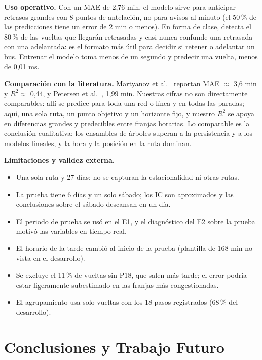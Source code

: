 \documentclass[conference,spanish]{IEEEtran}
\begin{document}
\textbf{Uso operativo.} Con un MAE de 2,76 min, el modelo sirve para anticipar retrasos grandes con 8 puntos de antelación, no para avisos al minuto (el 50\,\% de las predicciones tiene un error de 2 min o menos). En forma de clase, detecta el 80\,\% de las vueltas que llegarán retrasadas y casi nunca confunde una retrasada con una adelantada: es el formato más útil para decidir si retener o adelantar un bus. Entrenar el modelo toma menos de un segundo y predecir una vuelta, menos de 0,01 ms.

\textbf{Comparación con la literatura.} Martyanov et al.~\cite{martyanov2026} reportan MAE $\approx$ 3,6 min y $R^2\approx$ 0,44, y Petersen et al.~\cite{petersen2019}, 1,99 min. Nuestras cifras no son directamente comparables: allí se predice para toda una red o línea y en todas las paradas; aquí, una sola ruta, un punto objetivo y un horizonte fijo, y nuestro $R^2$ se apoya en diferencias grandes y predecibles entre franjas horarias. Lo comparable es la conclusión cualitativa: los ensambles de árboles superan a la persistencia y a los modelos lineales, y la hora y la posición en la ruta dominan.

\textbf{Limitaciones y validez externa.}
\begin{itemize}
    \item Una sola ruta y 27 días: no se capturan la estacionalidad ni otras rutas.
    \item La prueba tiene 6 días y un solo sábado; los IC son aproximados y las conclusiones sobre el sábado descansan en un día.
    \item El periodo de prueba se usó en el E1, y el diagnóstico del E2 sobre la prueba motivó las variables en tiempo real.
    \item El horario de la tarde cambió al inicio de la prueba (plantilla de 168 min no vista en el desarrollo).
    \item Se excluye el 11\,\% de vueltas sin P18, que salen más tarde; el error podría estar ligeramente subestimado en las franjas más congestionadas.
    \item El agrupamiento usa solo vueltas con los 18 pasos registrados (68\,\% del desarrollo).
\end{itemize}

\section{Conclusiones y Trabajo Futuro}
\end{document}
